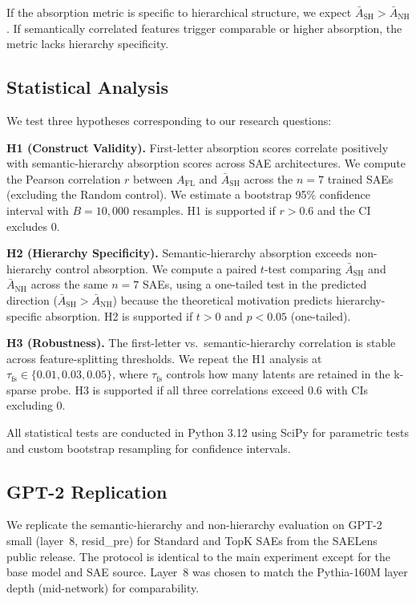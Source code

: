 \documentclass{article}
\begin{document}
If the absorption metric is specific to hierarchical structure, we expect $\bar{A}_{\text{SH}} > \bar{A}_{\text{NH}}$. If semantically correlated features trigger comparable or higher absorption, the metric lacks hierarchy specificity.

\subsection{Statistical Analysis}\label{sec:hypotheses}

We test three hypotheses corresponding to our research questions:

\textbf{H1 (Construct Validity).} First-letter absorption scores correlate positively with semantic-hierarchy absorption scores across SAE architectures. We compute the Pearson correlation $r$ between $A_{\text{FL}}$ and $\bar{A}_{\text{SH}}$ across the $n = 7$ trained SAEs (excluding the Random control). We estimate a bootstrap 95\% confidence interval with $B = 10{,}000$ resamples. H1 is supported if $r > 0.6$ and the CI excludes 0.

\textbf{H2 (Hierarchy Specificity).} Semantic-hierarchy absorption exceeds non-hierarchy control absorption. We compute a paired $t$-test comparing $\bar{A}_{\text{SH}}$ and $\bar{A}_{\text{NH}}$ across the same $n = 7$ SAEs, using a one-tailed test in the predicted direction ($\bar{A}_{\text{SH}} > \bar{A}_{\text{NH}}$) because the theoretical motivation predicts hierarchy-specific absorption. H2 is supported if $t > 0$ and $p < 0.05$ (one-tailed).

\textbf{H3 (Robustness).} The first-letter vs.~semantic-hierarchy correlation is stable across feature-splitting thresholds. We repeat the H1 analysis at $\tau_{\text{fs}} \in \{0.01, 0.03, 0.05\}$, where $\tau_{\text{fs}}$ controls how many latents are retained in the k-sparse probe. H3 is supported if all three correlations exceed 0.6 with CIs excluding 0.

All statistical tests are conducted in Python 3.12 using SciPy \citep{virtanen2020scipy} for parametric tests and custom bootstrap resampling for confidence intervals.

\subsection{GPT-2 Replication}

We replicate the semantic-hierarchy and non-hierarchy evaluation on GPT-2 small (layer~8, resid\_pre) for Standard and TopK SAEs from the SAELens public release. The protocol is identical to the main experiment except for the base model and SAE source. Layer~8 was chosen to match the Pythia-160M layer depth (mid-network) for comparability.
\end{document}

